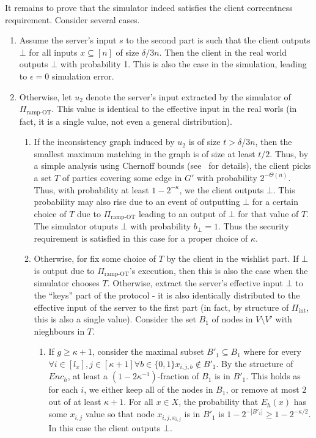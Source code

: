 \documentclass[a4paper]{article}
\newcommand{\INT}{\Pi_{\text{int}}}
\begin{document}
It remains to prove that the simulator indeed satisfies the client correcntness requirement. Consider several cases.
\begin{enumerate}
	\item Assume the server's input $s$ to the second part is such that the client outputs $\bot$ for all inputs $x\subseteq[n]$ of size $\delta/3 n$. Then the client in the real world outputs $\bot$ with probability 1. This is also the case in the simulation, leading to $\epsilon=0$ simulation error.
	\item Otherwise, let $u_2$ denote the server's input extracted by the simulator of $\Pi_{\text{ramp-OT}}$. This value is identical to the effective input in the real worls (in fact, it is a single value, not even a general distribution).
	\begin{enumerate}
	\item If the inconsistency graph induced by $u_2$ is of size $t>\delta/3 n$, then the smallest  maximum matching in the graph is of size at least $t/2$. Thus, by a simple analysis using Chernoff bounds (see~\cite{} for details), the client picks a set $T$ of parties covering some edge in $G'$ with probability $2^{-\Theta(n)}$. Thus, with probability at least $1-2^{-\kappa}$, we the client outputs $\bot$. This probability may also rise due to an event of outputting $\bot$ for a certain choice of $T$ due to $\Pi_{\text{ramp-OT}}$ leading to an output of $\bot$ for that value of $T$. The simulator otuputs $\bot$ with probability $b_\bot=1$. Thus the security requirement is satisfied in this case for a proper choice of $\kappa$.  
	\item Otherwise, for fix some choice of $T$ by the client in the wishlist part. If $\bot$ is output due to $\Pi_{\text{ramp-OT}}$'s execution, then this is also the case when the simulator chooses $T$.
	Otherwise, extract  the server's effective input $\bot$ to the ``keys'' part of the protocol - it is also identically distributed to the effective input of the server to the first part (in fact, by structure of $\INT$, this is also a single value).
	Consider the set $B_1$ of nodes in $V\setminus{V'}$ with nieghbours in $T$. 
	\begin{enumerate}
		\item\label{it-1} If $g\geq \kappa+1$, consider the maximal subset $B'_1\subseteq B_1$ where for every $\forall i\in[l_x],j\in[\kappa+1]\forall b\in\{0,1\}x_{i,j,b}\notin B'_1$. By the structure of $Enc_h$, at least a $(1-2\kappa^{-1})$-fraction of $B_1$ is in $B'_1$. This holds as for each $i$, we either keep all of the nodes in $B_1$, or remove at most $2$ out of at least $\kappa+1$. For all $x\in X$, the probability that $E_h(x)$ has some $x_{i,j}$ value so that node $x_{i,j,x_{i,j}}$ is in $B'_1$ is $1-2^{-|B'_1|}\geq 1-2^{-\kappa/2}$. In this case the client outputs $\bot$.

\end{enumerate}
\end{enumerate}
\end{enumerate}
\end{document}
